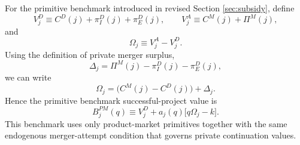 For the primitive benchmark introduced in revised Section \ref{sec:subsidy}, define
\begin{equation}
    V_j^D \equiv C^D(j)+\pi_I^D(j)+\pi_E^D(j),
    \qquad
    V_j^A \equiv C^M(j)+\Pi^M(j),
\end{equation}
and
\begin{equation}
    \Omega_j \equiv V_j^A-V_j^D.
\end{equation}
Using the definition of private merger surplus,
\begin{equation}
    \Delta_j=\Pi^M(j)-\pi_I^D(j)-\pi_E^D(j),
\end{equation}
we can write
\begin{equation}
    \Omega_j
    =
    \bigl(C^M(j)-C^D(j)\bigr)+\Delta_j.
\end{equation}
Hence the primitive benchmark successful-project value is
\begin{equation}
    B_j^{PM}(q)\equiv V_j^D+a_j(q)\bigl[q\Omega_j-k\bigr].
\end{equation}
This benchmark uses only product-market primitives together with the same endogenous merger-attempt
condition that governs private continuation values.

